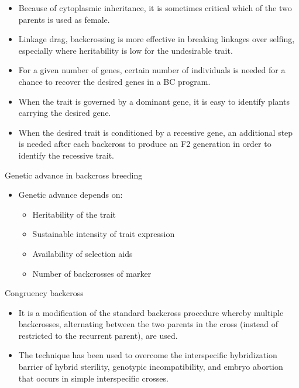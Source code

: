 \documentclass[11pt,ignorenonframetext,aspectratio=169]{beamer}
\providecommand{\tightlist}{%
  \setlength{\itemsep}{0pt}\setlength{\parskip}{0pt}}
\begin{document}
\begin{frame}{}
\protect\hypertarget{section-19}{}
\begin{itemize}
\tightlist
\item
  Because of cytoplasmic inheritance, it is sometimes critical which of
  the two parents is used as female.
\item
  Linkage drag, backcrossing is more effective in breaking linkages over
  selfing, especially where heritability is low for the undesirable
  trait.
\item
  For a given number of genes, certain number of individuals is needed
  for a chance to recover the desired genes in a BC program.
\item
  When the trait is governed by a dominant gene, it is easy to identify
  plants carrying the desired gene.
\item
  When the desired trait is conditioned by a recessive gene, an
  additional step is needed after each backcross to produce an F2
  generation in order to identify the recessive trait.
\end{itemize}
\end{frame}

\begin{frame}{Genetic advance in backcross breeding}
\protect\hypertarget{genetic-advance-in-backcross-breeding}{}
\begin{itemize}
\tightlist
\item
  Genetic advance depends on:

  \begin{itemize}
  \tightlist
  \item
    Heritability of the trait
  \item
    Sustainable intensity of trait expression
  \item
    Availability of selection aids
  \item
    Number of backcrosses of marker
  \end{itemize}
\end{itemize}
\end{frame}

\begin{frame}{Congruency backcross}
\protect\hypertarget{congruency-backcross}{}
\begin{itemize}
\tightlist
\item
  It is a modification of the standard backcross procedure whereby
  multiple backcrosses, alternating between the two parents in the cross
  (instead of restricted to the recurrent parent), are used.
\item
  The technique has been used to overcome the interspecific
  hybridization barrier of hybrid sterility, genotypic incompatibility,
  and embryo abortion that occurs in simple interspecific crosses.
\end{itemize}
\end{frame}
\end{document}
